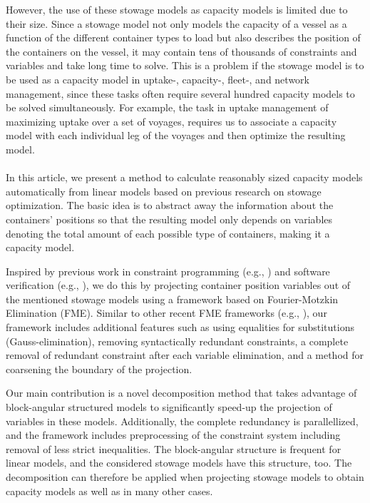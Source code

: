 However, the use of these stowage models as capacity models is limited due to their size. Since a stowage model not only models the capacity of a vessel as a function of the different container types to load but also describes the position of the containers on the vessel, it may contain tens of thousands of constraints and variables and take long time to solve. This is a problem if the stowage model is to be used as a capacity model in uptake-, capacity-, fleet-, and network management, since these tasks often require several hundred capacity models to be solved simultaneously. For example, the task in uptake management of maximizing uptake over a set of voyages, requires us to associate a capacity model with each individual leg of the voyages and then optimize the resulting model.  
\\\\
In this article, we present a method to calculate reasonably sized capacity models automatically from linear models based on previous research on stowage optimization. The basic idea is to abstract away the information about the containers' positions so that the resulting model only depends on variables denoting the total amount of each possible type of containers, making it a capacity model. %

Inspired by previous work in constraint programming (e.g., \cite{lassez90}) and software verification (e.g., \cite{benoy05}), we do this by projecting container position variables out of the mentioned stowage models using a framework based on Fourier-Motzkin Elimination (FME). 
Similar to other recent FME frameworks (e.g., \cite{simon05,lukatskii08,shapot12}), our framework includes additional features such as using equalities for substitutions (Gauss-elimination), removing syntactically redundant constraints, a complete removal of redundant constraint after each variable elimination, and a method for coarsening the boundary of the projection. 

Our main contribution is a novel decomposition method that takes advantage of block-angular structured models to significantly speed-up the projection of variables in these models. Additionally, the complete redundancy is parallellized, %
and the framework includes preprocessing of the constraint system including removal of less strict inequalities.
The block-angular structure is frequent for linear models, and the considered stowage models have this structure, too. The decomposition can therefore be applied when projecting stowage models to obtain capacity models as well as in many other cases.  

